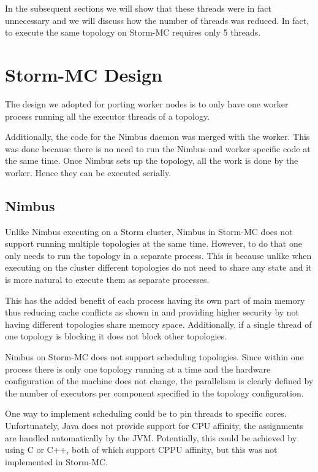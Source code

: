 \documentclass[bsc,logo,frontabs,twoside,singlespacing,normalheadings,parskip]{infthesis}\usepackage[]{graphicx}\usepackage[]{color}
\let\Oldtodo\todo
\renewcommand{\todo}[1]{\Oldtodo[inline]{#1}}
\begin{document}
In the subsequent sections we will show that these threads were in fact unnecessary and we will discuss how the number of threads was reduced. In fact, to execute the same topology on Storm-MC requires only 5 threads.

\section{Storm-MC Design}
\label{sec:storm_mc_arch}

\todo{Probably don't call this Architecture}

The design we adopted for porting worker nodes is to only have one worker process running all the executor threads of a topology.

Additionally, the code for the Nimbus daemon was merged with the worker. This was done because there is no need to run the Nimbus and worker specific code at the same time. Once Nimbus sets up the topology, all the work is done by the worker. Hence they can be executed serially.

\subsection{Nimbus}

Unlike Nimbus executing on a Storm cluster, Nimbus in Storm-MC does not support running multiple topologies at the same time. However, to do that one only needs to run the topology in a separate process. This is because unlike when executing on the cluster different topologies do not need to share any state and it is more natural to execute them as separate processes.

This has the added benefit of each process having its own part of main memory thus reducing cache conflicts as shown in \cite{Chandra:2005:PIC:1042442.1043432} and providing higher security by not having different topologies share memory space. Additionally, if a single thread of one topology is blocking it does not block other topologies.

Nimbus on Storm-MC does not support scheduling topologies. Since within one process there is only one topology running at a time and the hardware configuration of the machine does not change, the parallelism is clearly defined by the number of executors per component specified in the topology configuration.

One way to implement scheduling could be to pin threads to specific cores. Unfortunately, Java does not provide support for CPU affinity, the assignments are handled automatically by the JVM. Potentially, this could be achieved by using C or C++, both of which support CPPU affinity, but this was not implemented in Storm-MC.
\end{document}
